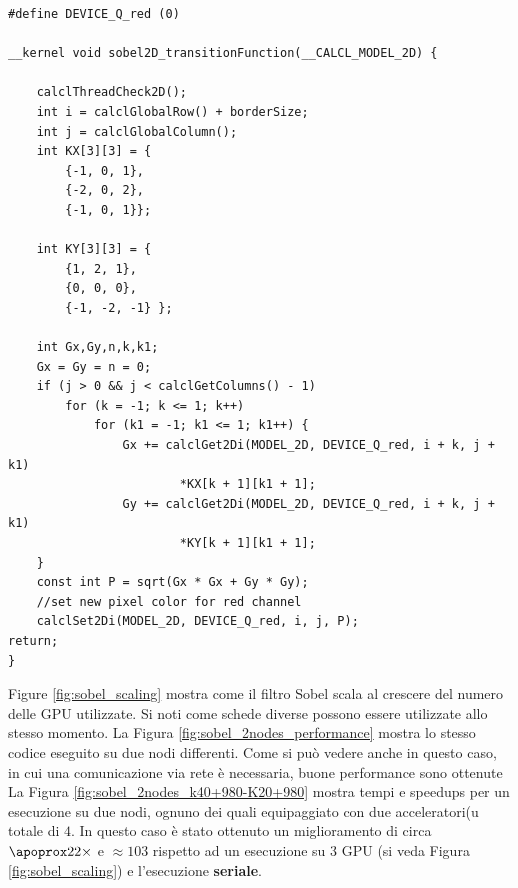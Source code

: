 \begin{lstlisting}
#define DEVICE_Q_red (0)

__kernel void sobel2D_transitionFunction(__CALCL_MODEL_2D) {

	calclThreadCheck2D();
	int i = calclGlobalRow() + borderSize;
	int j = calclGlobalColumn();
	int KX[3][3] = {
		{-1, 0, 1},
		{-2, 0, 2},
		{-1, 0, 1}};
	
	int KY[3][3] = {
		{1, 2, 1},
		{0, 0, 0},
		{-1, -2, -1} };
	
	int Gx,Gy,n,k,k1;
	Gx = Gy = n = 0;
	if (j > 0 && j < calclGetColumns() - 1)
		for (k = -1; k <= 1; k++)
			for (k1 = -1; k1 <= 1; k1++) {
				Gx += calclGet2Di(MODEL_2D, DEVICE_Q_red, i + k, j + k1)
						*KX[k + 1][k1 + 1];
				Gy += calclGet2Di(MODEL_2D, DEVICE_Q_red, i + k, j + k1)
						*KY[k + 1][k1 + 1];
	}
	const int P = sqrt(Gx * Gx + Gy * Gy);
	//set new pixel color for red channel
	calclSet2Di(MODEL_2D, DEVICE_Q_red, i, j, P);
return;
}
\end{lstlisting}
Figure \ref{fig:sobel_scaling} mostra come il filtro Sobel scala al crescere del numero delle GPU utilizzate. Si noti come schede diverse possono essere utilizzate allo stesso momento.
La  Figura \ref{fig:sobel_2nodes_performance} mostra lo stesso codice eseguito su due nodi differenti. Come si può vedere anche in questo caso, in cui una comunicazione via rete è necessaria, buone performance sono ottenute
La Figura \ref{fig:sobel_2nodes_k40+980-K20+980} mostra tempi e speedups per un esecuzione su due nodi, ognuno dei quali equipaggiato con due acceleratori(u totale di $4$. In questo caso è stato ottenuto un miglioramento di circa $\apoprox 22 \times$ e $\approx 103$ rispetto ad un esecuzione su $3$ GPU (si veda Figura \ref{fig:sobel_scaling}) e l'esecuzione \textbf{seriale}.
